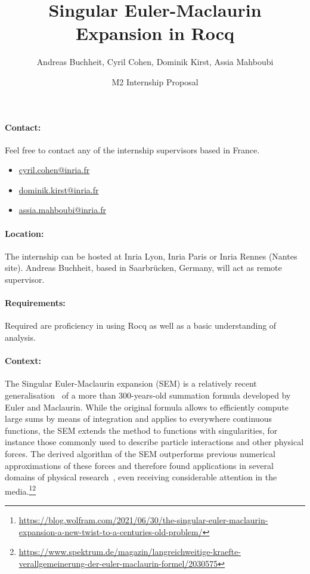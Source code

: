 \documentclass{article}
\begin{document}
\title{Singular Euler-Maclaurin Expansion in Rocq}
\author{Andreas Buchheit, Cyril Cohen, Dominik Kirst, Assia Mahboubi}

\date{M2 Internship Proposal}

\maketitle

\paragraph{Contact:}
Feel free to contact any of the internship supervisors based in France.
\begin{itemize}
	\item
	\url{cyril.cohen@inria.fr}
	\item
	\url{dominik.kirst@inria.fr}
	\item
	\url{assia.mahboubi@inria.fr}
\end{itemize}

\vspace{-0.2cm}
\paragraph{Location:}
The internship can be hosted at Inria Lyon, Inria Paris or Inria Rennes (Nantes site). Andreas Buchheit, based in Saarbrücken, Germany, will act as remote supervisor.

\vspace{-0.2cm}
\paragraph{Requirements:}
Required are proficiency in using Rocq as well as a basic understanding of analysis.

\vspace{-0.2cm}
\paragraph{Context:}
The Singular Euler-Maclaurin expansion (SEM) is a relatively recent generalisation~\cite{buchheit2022singular,buchheit2022efficient} of a more than 300-years-old summation formula developed by Euler and Maclaurin.
While the original formula allows to efficiently compute large sums by means of integration and applies to everywhere continuous functions, the SEM extends the method to functions with singularities, for instance those commonly used to describe particle interactions and other physical forces.
The derived algorithm of the SEM outperforms previous numerical approximations of these forces and therefore found applications in several domains of physical research~\cite{buchheit2023exact}, even receiving considerable attention in the media.\footnote{\scriptsize\url{https://blog.wolfram.com/2021/06/30/the-singular-euler-maclaurin-expansion-a-new-twist-to-a-centuries-old-problem/}}\footnote{\scriptsize\url{https://www.spektrum.de/magazin/langreichweitige-kraefte-verallgemeinerung-der-euler-maclaurin-formel/2030575}}
\end{document}

